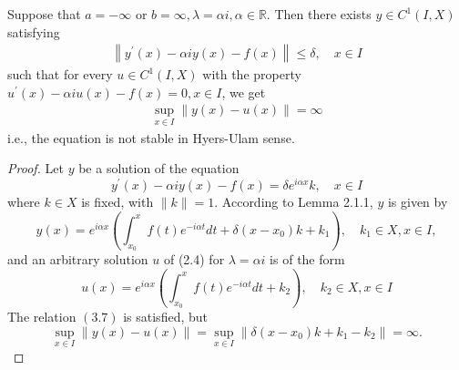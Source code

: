 \documentclass[a4paper,12pt]{report}
\begin{document}
\begin{thm}
	Suppose that $a=-\infty$ or $b=\infty, \lambda=\alpha i, \alpha \in \mathbb{R}$. Then there exists $y \in C^{1}(I, X)$ satisfying
	\begin{eqnarray}
		\left\|y^{\prime}(x)-\alpha i y(x)-f(x)\right\| \le \delta, \quad x \in I 
	\end{eqnarray}
such that for every $u \in C^{1}(I, X)$ with the property \\ $u^{\prime}(x)-\alpha i u(x)-f(x)=0, x \in I$, we get
\begin{eqnarray}
\sup _{x \in I}\|y(x)-u(x)\|=\infty
\end{eqnarray}
i.e., the equation is not stable in Hyers-Ulam sense. \\
\begin{proof}
	Let $y$ be a solution of the equation
	$$y^{\prime}(x)-\alpha i y(x)-f(x)=\delta e^{i \alpha x} k, \quad x \in I$$
	where $k \in X$ is fixed, with $\|k\|=1$.
	According to Lemma 2.1.1, \linebreak $y$ is given by
	$$
	y(x)=e^{i \alpha x}\left(\int_{x_{0}}^{x} f(t) e^{-i \alpha t} d t+\delta\left(x-x_{0}\right) k+k_{1}\right), \quad k_{1} \in X, x \in I,
	$$
	and an arbitrary solution $u$ of (2.4) for $\lambda=\alpha i$ is of the form
	$$
	u(x)=e^{i \alpha x}\left(\int_{x_{0}}^{x} f(t) e^{-i \alpha t} d t+k_{2}\right), \quad k_{2} \in X, x \in I
	$$
	The relation $(3.7)$ is satisfied, but
	$$
	\sup _{x \in I}\|y(x)-u(x)\|=\sup _{x \in I}\left\|\delta\left(x-x_{0}\right) k+k_{1}-k_{2}\right\|=\infty . $$
\end{proof}
\end{thm}
\end{document}
